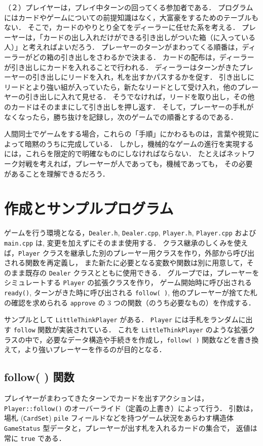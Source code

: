 （２）プレイヤーは，プレイ中ターンの回ってくる参加者である．
プログラムにはカードやゲームについての前提知識はなく，大富豪をするためのテーブルもない．
そこで，カードのやりとり全てをディーラーに任せた系を考える．
プレーヤーは，「カードの出し入れだけができる引き出しがついた箱（に入っている人）」と考えればよいだろう．
プレーヤーのターンがまわってくる順番は，ディーラーがどの箱の引き出しをさわるかで決まる．
カードの配布は，ディーラーが引き出しにカードを入れることで行われる．
ディーラーはターンがきたプレーヤーの引き出しにリードを入れ，札を出すかパスするかを促す．
引き出しにリードとより強い組が入っていたら，新たなリードとして受け入れ，他のプレーヤーの引き出しに入れて見せる．
そうでなければ，リードを取り出し，その他のカードはそのままにして引き出しを押し返す．
そして，プレーヤーの手札がなくなったら，勝ち抜けを記録し，次のゲームでの順番とするのである．

人間同士でゲームをする場合，これらの「手順」にかわるものは，言葉や視覚によって暗黙のうちに完成している．
しかし，機械的なゲームの進行を実現するには，これらを限定的で明確なものにしなければならない．
たとえばネットワーク対戦を考えれば，プレーヤーが人であっても，機械であっても，
その必要があることを理解できるだろう．


\section{作成とサンプルプログラム}
ゲームを行う環境となる，\verb+Dealer.h+, \verb+Dealer.cpp+, \verb+Player.h+, \verb+Player.cpp+ および \verb+main.cpp+ は, 変更を加えずにそのまま使用する．
クラス継承のしくみを使えば，\verb+Player+ クラスを継承した別のプレーヤー用クラスを作り，外部から呼び出される関数を再定義し，
また新たに必要となる変数や関数は別に用意して，そのまま既存の \verb+Dealer+ クラスとともに使用できる．
グループでは，プレーヤーをシミュレートする \verb+Player+ の拡張クラスを作り，
ゲーム開始時に呼び出される \verb+ready()+, ターンがきた時に呼び出される \verb+follow( )+, 他のプレーヤーが捨てた札の確認を求められる \verb+approve+ の 3 つの関数（のうち必要なもの）を作成する．

サンプルとして \verb+LittleThinkPlayer+ がある．
\verb+Player+ には手札をランダムに出す \verb+follow+ 関数が実装されている．
これを \verb+LittleThinkPlayer+ のような拡張クラスの中で，必要なデータ構造や手続きを作成し，\verb+follow( )+ 関数などを書き換えて，より強いプレーヤーを作るのが目的となる．

\subsection{follow( ) 関数}
プレイヤーがまわってきたターンでカードを出すアクションは，\verb+Player::follow()+ のオーバーライド（定義の上書き）によって行う．
引数は，場札 (\verb+CardSet+) \verb+pile+ フィールドなどを持つゲーム状況をあらわす構造体 \verb+GameStatus+ 型データと，プレーヤーが出す札を入れるカードの集合で，
返値は常に \verb+true+ である．

